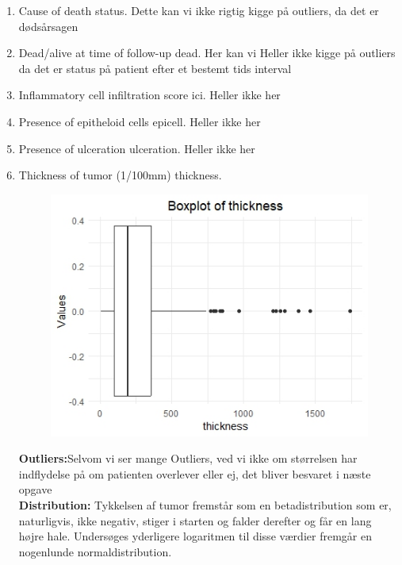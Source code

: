 \begin{enumerate}
\item Cause of death status. \newline
Dette kan vi ikke rigtig kigge på outliers, da det er dødsårsagen 
\item Dead/alive at time of follow-up dead. \newline
Her kan vi Heller ikke kigge på outliers da det er status på patient efter et bestemt tids interval
\item Inflammatory cell infiltration score ici. \newline
Heller ikke her
\item Presence of epitheloid cells epicell. \newline
Heller ikke her
\item Presence of ulceration ulceration. \newline
Heller ikke her
\item Thickness of tumor (1/100mm) thickness.
\newline
\begin{figure}[h]
    \centering
    \includegraphics[width=0.5\linewidth]{Basses_kode/Billeder_duration/Outliers_thickness.jpeg}
\end{figure}
\textbf{Outliers:}Selvom vi ser mange Outliers, ved vi ikke om størrelsen har indflydelse på om patienten overlever eller ej, det bliver besvaret i næste opgave\\
\textbf{Distribution: } Tykkelsen af tumor fremstår som en betadistribution som er, naturligvis, ikke negativ, stiger i starten og falder derefter og får en lang højre hale. Undersøges yderligere logaritmen til disse værdier fremgår en nogenlunde normaldistribution.\\


\end{enumerate}
